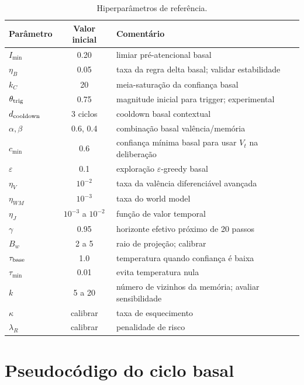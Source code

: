 \begin{table}[H]
\centering
\caption{Hiperparâmetros de referência.}
\begin{tabularx}{\textwidth}{l c X}
\toprule
\textbf{Parâmetro} & \textbf{Valor inicial} & \textbf{Comentário}\\
\midrule
\(I_{\min}\) & 0.20 & limiar pré-atencional basal\\
\(\eta_B\) & 0.05 & taxa da regra delta basal; validar estabilidade\\
\(k_C\) & 20 & meia-saturação da confiança basal\\
\(\theta_{\rm trig}\) & 0.75 & magnitude inicial para trigger; experimental\\
\(d_{\rm cooldown}\) & 3 ciclos & cooldown basal contextual\\
\(\alpha,\beta\) & 0.6, 0.4 & combinação basal valência/memória\\
\(c_{\min}\) & 0.6 & confiança mínima basal para usar \(V_t\) na deliberação\\
\(\varepsilon\) & 0.1 & exploração \(\varepsilon\)-greedy basal\\
\(\eta_V\) & \(10^{-2}\) & taxa da valência diferenciável avançada\\
\(\eta_{WM}\) & \(10^{-3}\) & taxa do world model\\
\(\eta_J\) & \(10^{-3}\) a \(10^{-2}\) & função de valor temporal\\
\(\gamma\) & 0.95 & horizonte efetivo próximo de 20 passos\\
\(B_w\) & 2 a 5 & raio de projeção; calibrar\\
\(\tau_{\rm base}\) & 1.0 & temperatura quando confiança é baixa\\
\(\tau_{\min}\) & 0.01 & evita temperatura nula\\
\(k\) & 5 a 20 & número de vizinhos da memória; avaliar sensibilidade\\
\(\kappa\) & calibrar & taxa de esquecimento\\
\(\lambda_R\) & calibrar & penalidade de risco\\
\bottomrule
\end{tabularx}
\end{table}

\section{Pseudocódigo do ciclo basal}

